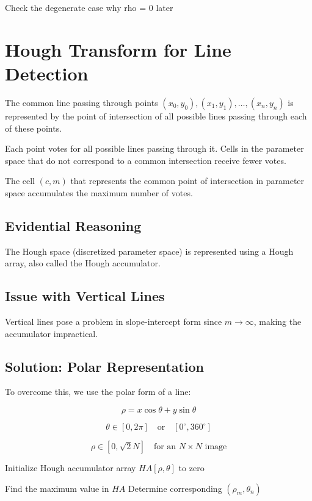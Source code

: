 \documentclass[11pt]{article}
\theoremstyle{definition}
\begin{document}
Check the degenerate case why rho = 0 later

\newpage
\section*{Hough Transform for Line Detection}

The common line passing through points $(x_0, y_0), (x_1, y_1), \dots, (x_n, y_n)$ 
is represented by the point of intersection of all possible lines passing through each of these points.

Each point votes for all possible lines passing through it. Cells in the parameter space that do not correspond to a common intersection receive fewer votes.

The cell $(c, m)$ that represents the common point of intersection in parameter space accumulates the maximum number of votes.

\subsection*{Evidential Reasoning}

The Hough space (discretized parameter space) is represented using a Hough array, also called the Hough accumulator.

\subsection*{Issue with Vertical Lines}

Vertical lines pose a problem in slope-intercept form since $m \to \infty$, making the accumulator impractical.

\subsection*{Solution: Polar Representation}

To overcome this, we use the polar form of a line:

\[
\rho = x \cos \theta + y \sin \theta
\]

\[
\theta \in [0, 2\pi] \quad \text{or} \quad [0^\circ, 360^\circ]
\]

\[
\rho \in \left[0, \sqrt{2}N\right] \quad \text{for an } N \times N \text{ image}
\]

\begin{algorithm}[H]
\caption{Hough Transform Algorithm}

Initialize Hough accumulator array $HA[\rho, \theta]$ to zero\;


Find the maximum value in $HA$\;
Determine corresponding $(\rho_m, \theta_n)$\;

\end{algorithm}
\end{document}
